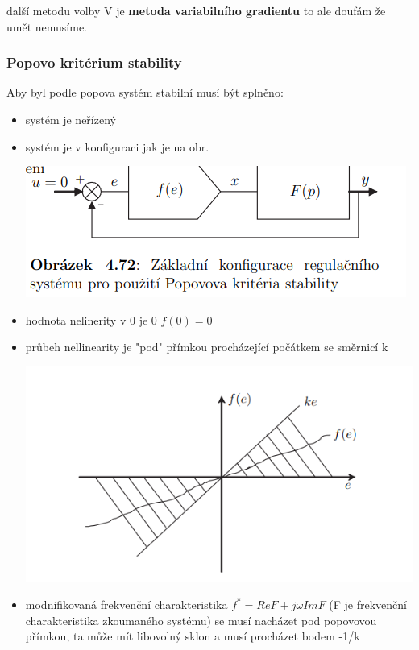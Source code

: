 další metodu volby V je {\bf metoda variabilního gradientu } to ale doufám že umět nemusíme.

\subsubsection{Popovo kritérium stability}
Aby byl podle popova systém stabilní musí být splněno:
\begin{itemize}
    \item systém je neřízený
    \item systém  je v konfiguraci jak je na obr.

        \includegraphics{img/popov.schem.png}
    \item hodnota nelinerity v 0 je 0 $f(0)=0$
    \item průbeh nellinearity je "pod" přímkou procházející počátkem se směrnicí k

        \includegraphics{img/popov_nelilin.png}
    \item modnifikovaná frekvenční charakteristika $f^*=Re{F}+j\omega Im{F}$ (F je frekvenční charakteristika zkoumaného systému) se musí nacházet pod popovovou přímkou,
    ta může mít libovolný sklon a musí procházet bodem -1/k


\end{itemize}
